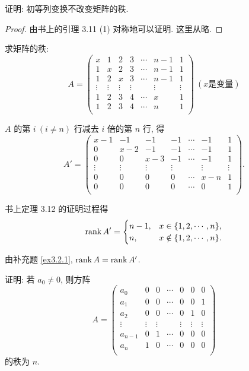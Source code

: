 \documentclass[color=black,device=normal,lang=cn,mode=geye]{elegantnote}
\begin{document}
\begin{exercisec}[3.2.1(1)]\label{ex3.2.1}
    证明: 初等列变换不改变矩阵的秩.
\end{exercisec}
\begin{proof}
    由书上的引理 3.11 (1) 对称地可以证明. 这里从略.
\end{proof}
\begin{exercisec}[3.2.2(5)]
    求矩阵的秩:
    \[A=\begin{pmatrix}
        x & 1 & 2 & 3 & \cdots & n-1 & 1 \\
        1 & x & 2 & 3 & \cdots & n-1 & 1 \\
        1 & 2 & x & 3 & \cdots & n-1 & 1 \\
        \vdots & \vdots & \vdots & \vdots && \vdots & \vdots \\
        1 & 2 & 3 & 4 & \cdots & x & 1 \\
        1 & 2 & 3 & 4 & \cdots & n & 1 \\
    \end{pmatrix}\ (x \text{是变量})\]
\end{exercisec}
\begin{solution}
    $A$ 的第 $i\ (i\neq n)$ 行减去 $i$ 倍的第 $n$ 行, 得
    \[A'=\begin{pmatrix}
        x-1 & -1 & -1 & -1 & \cdots & -1 & 1 \\
        0 & x-2 & -1 & -1 & \cdots & -1 & 1 \\
        0 & 0 & x-3 & -1 & \cdots & -1 & 1 \\
        \vdots & \vdots & \vdots & \vdots && \vdots & \vdots \\
        0 & 0 & 0 & 0 & \cdots & x-n & 1 \\
        0 & 0 & 0 & 0 & \cdots & 0 & 1 \\
    \end{pmatrix}.\]

    书上定理 3.12 的证明过程得
    \[\operatorname{rank} A'=\begin{cases}
        n-1, & x\in\{1,2,\cdots,n\}, \\
        n, & x\notin\{1,2,\cdots,n\}. \\
    \end{cases}\]

    由补充题 \ref{ex3.2.1}, $\operatorname{rank} A=\operatorname{rank} A'$.
\end{solution}
\begin{exercisec}[3.2.3]
    证明: 若 $a_0\neq0$, 则方阵
    \[A=\begin{pmatrix}
        a_0 & 0 & 0 & \cdots & 0 & 0 & 0 \\
        a_1 & 0 & 0 & \cdots & 0 & 0 & 1 \\
        a_2 & 0 & 0 & \cdots & 0 & 1 & 0 \\
        \vdots & \vdots & \vdots && \vdots & \vdots & \vdots \\
        a_{n-1} & 0 & 1 & \cdots & 0 & 0 & 0 \\
        a_n & 1 & 0 & \cdots & 0 & 0 & 0 \\
    \end{pmatrix}\]
    的秩为 $n$.
\end{exercisec}
\end{document}
